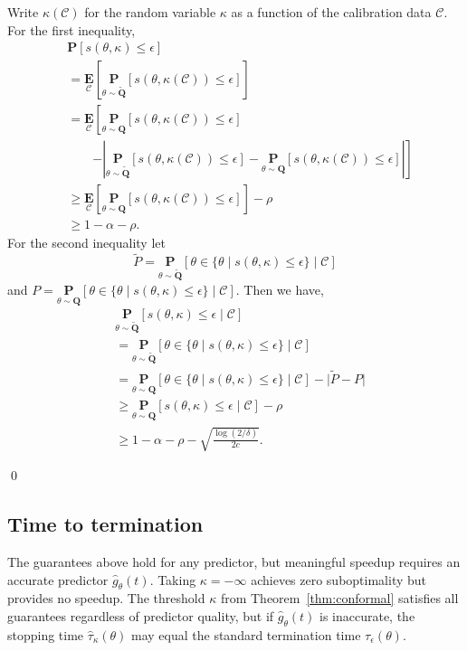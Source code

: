 \documentclass[12pt]{article}
\theoremstyle{definition}
\theoremstyle{remark}
\newcommand{\paramdist}{\mathbf{Q}}
\newcommand{\param}{\theta}
\newcommand{\st}{\tau}
\newcommand{\Prob}{\mathbf{P}}
\newcommand{\E}{\mathbf{E}}
\newcommand{\predgap}{\hat{g}}
\newcommand{\tol}{\epsilon}
\newcommand{\pst}{\hat{\tau}}
\newcommand{\calibration}{\mathcal{C}}
\newcommand{\termov}{s}
\newcommand{\lt}{\kappa}
\newcommand{\ncalib}{c}
\newcommand{\change}[1]{#1}
\newcommand{\paramdist}{\mathbf{Q}}
\newcommand{\param}{\theta}
\newcommand{\st}{\tau}
\newcommand{\Prob}{\mathbf{P}}
\newcommand{\E}{\mathbf{E}}
\newcommand{\predgap}{\hat{g}}
\newcommand{\tol}{\epsilon}
\newcommand{\pst}{\hat{\tau}}
\newcommand{\calibration}{\mathcal{C}}
\newcommand{\termov}{s}
\newcommand{\lt}{\kappa}
\newcommand{\ncalib}{c}
\newcommand{\change}[1]{#1}
\theoremstyle{plain}
\theoremstyle{definition}
\theoremstyle{remark}
\begin{document}
    \change{
        Write $\lt(\calibration)$ for the random variable $\lt$ as a function of the calibration data $\calibration$.
        For the first inequality,
        \begin{align*}
            & \Prob\left[\termov(\param, \lt) \le \tol\right] \\ &= \underset{\calibration}{\E}\left[\underset{\param \sim \tilde{\paramdist}}{\Prob}\left[\termov(\param, \lt(\calibration)) \le \tol\right]\right] \\
            &= \underset{\calibration}{\E}\left[\underset{\param \sim \paramdist}{\Prob}\left[\termov(\param, \lt(\calibration)) \le \tol\right] \right. \\ & \qquad \left. - \left| \underset{\param \sim \tilde{\paramdist}}{\Prob}\left[\termov(\param, \lt(\calibration)) \le \tol\right] -  \underset{\param \sim \paramdist}{\Prob}\left[\termov(\param, \lt(\calibration)) \le \tol\right] \right| \right] \\
            & \ge \underset{\calibration}{\E}\left[\underset{\param \sim \paramdist}{\Prob}\left[\termov(\param, \lt(\calibration)) \le \tol\right]\right] - \rho \\
            &\ge 1 - \alpha - \rho.
        \end{align*}
        For the second inequality let $$\tilde{P} = \underset{\param \sim \tilde{\paramdist}}{\Prob}[\param \in \{\param \mid \termov(\param, \lt) \le \tol\} \mid \calibration]$$ and $P = \underset{\param \sim \paramdist}{\Prob}[\param \in \{\param \mid \termov(\param, \lt) \le \tol\} \mid \calibration]$. Then we have,
        \begin{align*}
            & \underset{\param \sim \tilde{\paramdist}}{\Prob}[\termov(\param, \lt) \le \tol \mid \calibration] \\ &= \underset{\param \sim \tilde{\paramdist}}{\Prob}[\param \in \{\param \mid \termov(\param, \lt) \le \tol\} \mid \calibration]
            \\ &= \underset{\param \sim \paramdist}{\Prob}[\param \in \{\param \mid \termov(\param, \lt) \le \tol\} \mid \calibration] - \Big| \tilde{P} - P \Big|
            \\ &\ge \underset{\param \sim \paramdist}{\Prob}[\termov(\param, \lt) \le \tol \mid \calibration] - \rho \\
            &\ge 1 - \alpha - \rho - \sqrt{\frac{\log(2/\delta)}{2\ncalib}}.
        \end{align*}
    }
\qed
\subsection{Time to termination}
The guarantees above hold for any predictor, but meaningful speedup requires an accurate predictor $\predgap_\param(t)$.
Taking $\lt = -\infty$ achieves zero suboptimality but provides no speedup.
The threshold $\lt$ from Theorem~\ref{thm:conformal} satisfies all guarantees regardless of predictor quality, but if $\predgap_\param(t)$ is inaccurate, the stopping time $\pst_\lt(\param)$ may equal the standard termination time $\st_\tol(\param)$.
\end{document}
